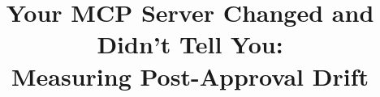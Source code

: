 \documentclass[conference,compsoc]{IEEEtran}
\begin{document}
\title{Your MCP Server Changed and Didn't Tell You:\\Measuring Post-Approval Drift}
\author{}
\maketitle

\begin{abstract}

\end{abstract}














\appendices

\end{document}
